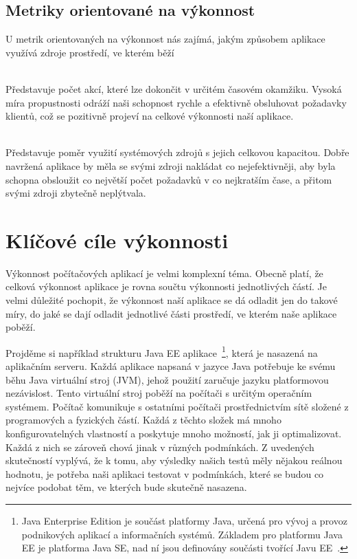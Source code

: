 \documentclass[122pt,oneside]{fithesis}
\begin{document}
\subsection{Metriky orientované na výkonnost}
U metrik orientovaných na výkonnost nás zajímá, jakým způsobem aplikace využívá zdroje prostředí, ve kterém běží

\vspace{5 mm}
\\\indent Představuje počet akcí, které lze dokončit v určitém časovém okamžiku. Vysoká míra propustnosti odráží naši schopnost rychle a efektivně obsluhovat požadavky klientů, což se pozitivně projeví na celkové výkonnosti naší aplikace.

\vspace{5 mm}
\\\indent Představuje poměr využití systémových zdrojů s jejich celkovou kapacitou. Dobře navržená aplikace by měla se svými zdroji nakládat co nejefektivněji, aby byla schopna obsloužit co největší počet požadavků v co nejkratším čase, a přitom svými zdroji zbytečně neplýtvala.

\section{Klíčové cíle výkonnosti}
Výkonnost počítačových aplikací je velmi komplexní téma. Obecně platí, že celková výkonnost aplikace je rovna součtu výkonnosti jednotlivých částí. Je velmi důležité pochopit, že výkonnost naší aplikace se dá odladit jen do takové míry, do jaké se dají odladit jednotlivé části prostředí, ve kterém naše aplikace poběží. 

Projděme si například strukturu Java EE aplikace~\footnote{Java Enterprise Edition je součást platformy Java, určená pro vývoj a provoz podnikových aplikací a informačních systémů. Základem pro platformu Java EE je platforma Java SE, nad ní jsou definovány součásti tvořící Javu EE~\cite{wikiJavaEE}.}, která je nasazená na aplikačním serveru. Každá aplikace napsaná v jazyce Java potřebuje ke svému běhu Java virtuální stroj (JVM), jehož použití zaručuje jazyku platformovou nezávislost. Tento virtuální stroj poběží na počítači s určitým operačním systémem. Počítač komunikuje s ostatními počítači prostřednictvím sítě složené z programových a fyzických částí. Každá z těchto složek má mnoho konfigurovatelných vlastností a poskytuje mnoho možností, jak ji optimalizovat. Každá z nich se zároveň chová jinak v různých podmínkách. Z uvedených skutečností vyplývá, že k tomu, aby výsledky našich testů měly nějakou reálnou hodnotu, je potřeba naši aplikaci testovat v podmínkách, které se budou co nejvíce podobat těm, ve kterých bude skutečně nasazena.
\end{document}

